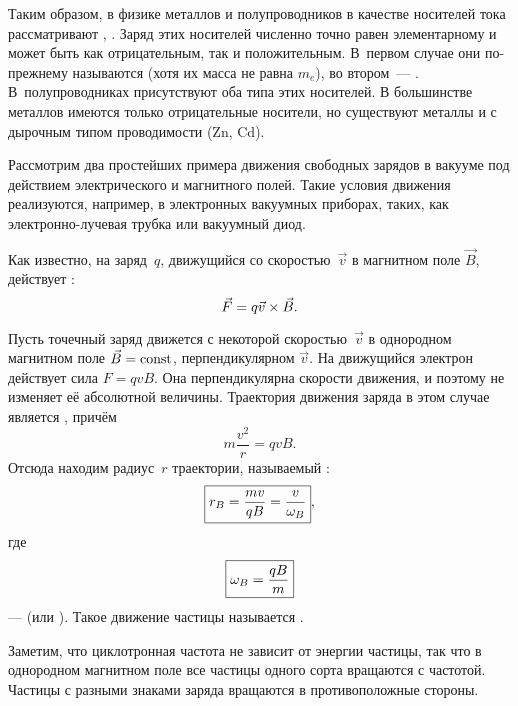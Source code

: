 Таким образом, в физике металлов и полупроводников в качестве носителей тока
рассматривают ,
.
Заряд этих носителей численно точно равен элементарному и может быть как
отрицательным, так и положительным. В~первом случае они по-прежнему называются
 (хотя их масса не равна $m_e$),
во втором~--- . В~полупроводниках присутствуют оба типа этих
носителей. В большинстве металлов имеются только отрицательные носители, но
существуют металлы и с дырочным типом проводимости (Zn, Cd).


\label{sec:freemotion}

Рассмотрим два простейших примера движения свободных зарядов в вакууме под
действием электрического и магнитного полей. Такие условия движения реализуются,
например, в электронных вакуумных приборах, таких, как электронно-лучевая
трубка или вакуумный диод.


Как известно, на заряд~$q$, движущийся со скоростью~$\vec{v}$ в магнитном поле
$\vec{B}$, действует :
\begin{equation*}
    \eqmark{3.1}
    \vec{F}=q{\vec{v}}\times{\vec{B}}.
\end{equation*}

Пусть точечный заряд движется с некоторой скоростью~$\vec{v}$ в
однородном магнитном поле $\vec{B}=\mathrm{const}$, перпендикулярном $\vec{v}$.
На движущийся электрон действует сила $F=qvB$. Она перпендикулярна
скорости движения, и поэтому не изменяет её абсолютной величины. Траектория
движения заряда в этом случае является , причём
\[
m\frac{v^2}{r}=qvB.
\]
Отсюда находим радиус~$r$ траектории, называемый :
\begin{equation}
    \eqmark{3.2}
    \boxed{r_B =\frac{m v}{qB}= \frac{v}{\omega_B}},
\end{equation}
где
\begin{equation}
    \eqmark{omega-B}
    \boxed{\omega_B=\frac{qB}{m}}
\end{equation}
---  (или ).
Такое движение частицы называется .

Заметим, что циклотронная частота не зависит от энергии частицы, так
что в однородном магнитном поле все частицы одного сорта вращаются с
 частотой. Частицы с разными знаками заряда вращаются в
противоположные стороны.

